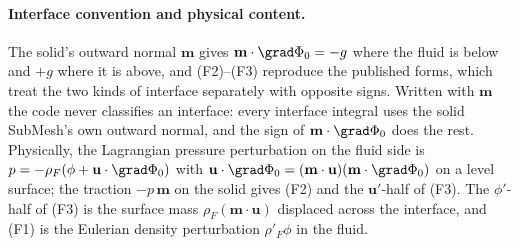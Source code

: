 \documentclass[11pt]{article}
\numberwithin{equation}{section}
\theoremstyle{remark}
\newcommand{\vu}{\mathbf{u}}
\newcommand{\vm}{\mathbf{m}}
\begin{document}
\paragraph{Interface convention and physical content.} The solid's
outward normal $\vm$ gives $\vm\cdot\grad\Phi_0 = -g$ where
the fluid is below and $+g$ where it is above, and (F2)--(F3) reproduce the
published forms, which treat the two kinds of interface separately with
opposite signs. Written with $\vm$ the code never classifies an interface:
every interface integral uses the solid SubMesh's own outward normal, and
the sign of $\vm\cdot\grad\Phi_0$ does the rest. Physically, the
Lagrangian pressure perturbation on the fluid side is $p = -\rho_F(\phi +
\vu\cdot\grad\Phi_0)$ with $\vu\cdot\grad\Phi_0 = (\vm\cdot\vu)
(\vm\cdot\grad\Phi_0)$ on a level surface; the traction $-p\,\vm$ on the
solid gives (F2) and the $\vu'$-half of (F3). The $\phi'$-half of (F3) is
the surface mass $\rho_F(\vm\cdot\vu)$ displaced across the interface, and
(F1) is the Eulerian density perturbation $\rho'_F\phi$ in the fluid.
\end{document}

